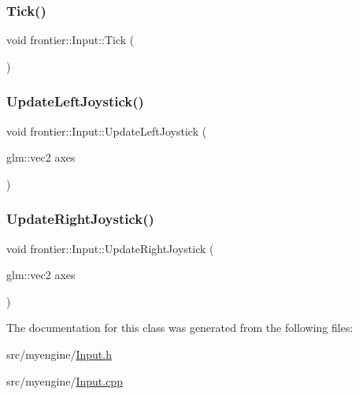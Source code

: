 \mbox{\label{classfrontier_1_1_input_ab3d78d816a9ae5ed02c9c91900097149}} 
\subsubsection{\texorpdfstring{Tick()}{Tick()}}
{\footnotesize\ttfamily void frontier\+::\+Input\+::\+Tick (\begin{DoxyParamCaption}{ }\end{DoxyParamCaption})}

\mbox{\label{classfrontier_1_1_input_ace92d811ccd65b1cccc8be927c840720}} 
\subsubsection{\texorpdfstring{Update\+Left\+Joystick()}{UpdateLeftJoystick()}}
{\footnotesize\ttfamily void frontier\+::\+Input\+::\+Update\+Left\+Joystick (\begin{DoxyParamCaption}\item[{glm\+::vec2}]{axes }\end{DoxyParamCaption})}

\mbox{\label{classfrontier_1_1_input_a19763242a418ba60581b767eb4c40b78}} 
\subsubsection{\texorpdfstring{Update\+Right\+Joystick()}{UpdateRightJoystick()}}
{\footnotesize\ttfamily void frontier\+::\+Input\+::\+Update\+Right\+Joystick (\begin{DoxyParamCaption}\item[{glm\+::vec2}]{axes }\end{DoxyParamCaption})}



The documentation for this class was generated from the following files\+:\begin{DoxyCompactItemize}
\item 
src/myengine/\hyperlink{_input_8h}{Input.\+h}\item 
src/myengine/\hyperlink{_input_8cpp}{Input.\+cpp}\end{DoxyCompactItemize}
